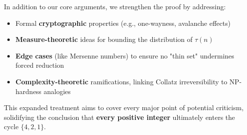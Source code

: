 In addition to our core arguments, we strengthen the proof by addressing:
\begin{itemize}
\item Formal \textbf{cryptographic} properties (e.g., one-wayness, avalanche effects)
\item \textbf{Measure-theoretic} ideas for bounding the distribution of $\tau(n)$
\item \textbf{Edge cases} (like Mersenne numbers) to ensure no "thin set" undermines forced reduction
\item \textbf{Complexity-theoretic} ramifications, linking Collatz irreversibility to NP-hardness analogies
\end{itemize}

This expanded treatment aims to cover every major point of potential criticism, solidifying the conclusion that \textbf{every positive integer} ultimately enters the cycle $\{4,2,1\}$. 